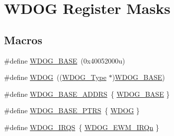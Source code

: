 \hypertarget{group___w_d_o_g___register___masks}{}\section{W\+D\+OG Register Masks}
\label{group___w_d_o_g___register___masks}
\subsection*{Macros}
\begin{DoxyCompactItemize}
\item 
\#define \mbox{\hyperlink{group___w_d_o_g___register___masks_ga0c092d77d4599871d1ebda1a3a28e887}{W\+D\+O\+G\+\_\+\+B\+A\+SE}}~(0x40052000u)
\item 
\#define \mbox{\hyperlink{group___w_d_o_g___register___masks_gab938901a5fa5443253fc293ebd0399e3}{W\+D\+OG}}~((\mbox{\hyperlink{struct_w_d_o_g___type}{W\+D\+O\+G\+\_\+\+Type}} $\ast$)\mbox{\hyperlink{group___w_d_o_g___register___masks_ga0c092d77d4599871d1ebda1a3a28e887}{W\+D\+O\+G\+\_\+\+B\+A\+SE}})
\item 
\#define \mbox{\hyperlink{group___w_d_o_g___register___masks_gaa48c10a6a132d044b0d2a7b495b303da}{W\+D\+O\+G\+\_\+\+B\+A\+S\+E\+\_\+\+A\+D\+D\+RS}}~\{ \mbox{\hyperlink{group___w_d_o_g___register___masks_ga0c092d77d4599871d1ebda1a3a28e887}{W\+D\+O\+G\+\_\+\+B\+A\+SE}} \}
\item 
\#define \mbox{\hyperlink{group___w_d_o_g___register___masks_ga8d50dba3756857eed1783b3d726d40d8}{W\+D\+O\+G\+\_\+\+B\+A\+S\+E\+\_\+\+P\+T\+RS}}~\{ \mbox{\hyperlink{group___w_d_o_g___register___masks_gab938901a5fa5443253fc293ebd0399e3}{W\+D\+OG}} \}
\item 
\#define \mbox{\hyperlink{group___w_d_o_g___register___masks_gad44cf9ab5d5c2116869c5570758d4eeb}{W\+D\+O\+G\+\_\+\+I\+R\+QS}}~\{ \mbox{\hyperlink{group___interrupt__vector__numbers_gga666eb0caeb12ec0e281415592ae89083a0bff68ffa0f6a24e0103f156f26487b3}{W\+D\+O\+G\+\_\+\+E\+W\+M\+\_\+\+I\+R\+Qn}} \}
\end{DoxyCompactItemize}
